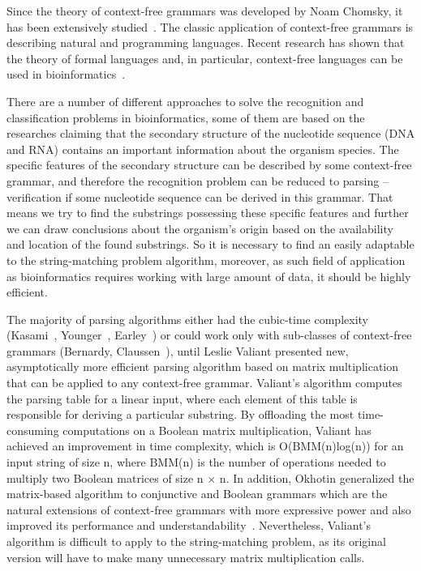 \documentclass[runningheads]{llncs}
\begin{document}
Since the theory of context-free grammars was developed by Noam Chomsky, it has been extensively studied~\cite{chomsky1,chomsky2}. The classic application of context-free grammars is describing natural and programming  languages. Recent  research has  shown  that the theory of formal languages and, in particular, context-free languages can be used in bioinformatics~\cite{rivas,knudsen,yuan,dowell}. 

There are a number of different approaches to solve the recognition and classification problems in bioinformatics, some of them are based on the researches claiming that the secondary structure of the nucleotide sequence (DNA and RNA) contains an important information about the organism species. The specific features of the secondary structure can be described by some context-free grammar, and therefore the recognition problem can be reduced to parsing -- verification if some nucleotide sequence can be derived in this grammar. That means we try to find the substrings possessing these specific features and further we can draw conclusions about the organism's origin based on the availability and location of the found substrings. So it is necessary to find an easily adaptable to the string-matching problem algorithm, moreover, as such field of application as bioinformatics requires working with large amount of data, it should be highly efficient.

The majority of parsing algorithms either had the cubic-time complexity (Kasami~\cite{kasami}, Younger~\cite{younger}, Earley~\cite{earley}) or could work only with sub-classes of context-free grammars (Bernardy, Claussen~\cite{bernardy}), until Leslie Valiant presented new, asymptotically more efficient parsing algorithm based on matrix multiplication~\cite{valiant} that can be applied to any context-free grammar. Valiant's algorithm computes the parsing table for a linear input, where each element of this table is responsible for deriving a particular substring. By offloading the most time-consuming computations on a Boolean matrix multiplication, Valiant has achieved an improvement in time complexity, which is O(BMM(n)log(n)) for an input string of size n, where BMM(n) is the number of operations needed to multiply two Boolean matrices of size n $\times$ n. In addition, Okhotin generalized the matrix-based algorithm to conjunctive and Boolean grammars which are the natural extensions of context-free grammars with more expressive power and also improved its performance and understandability~\cite{okhotin}. Nevertheless, Valiant's algorithm is difficult to apply to the string-matching problem, as its original version will have to make many unnecessary matrix multiplication calls.
\end{document}
